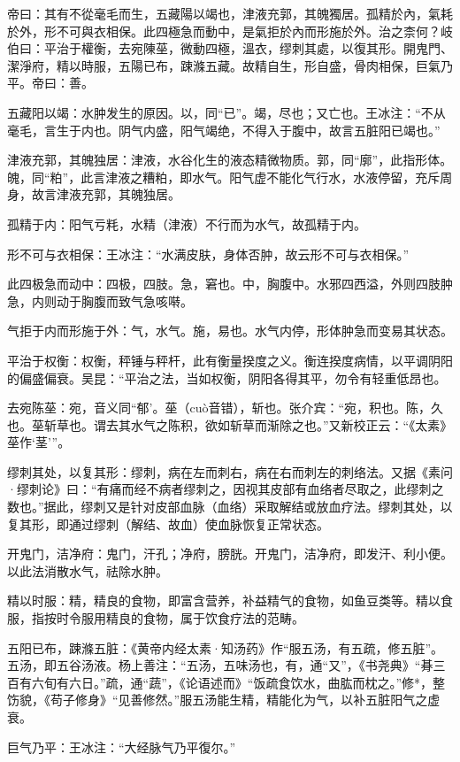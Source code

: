 \documentclass[draft,12pt]{ctexbook}
\begin{document}

\begin{yuanwen}
帝曰：其有不從毫毛而生，五藏陽以竭也，津液充郭，其魄獨居。孤精於內，氣耗於外，形不可與衣相保。此四極急而動中，是氣拒於內而形施於外。治之柰何？岐伯曰：平治于權衡，去宛陳莝，微動四極，溫衣，缪刺其處，以復其形。開鬼門、潔淨府，精以時服，五陽已布，踈滌五藏。故精自生，形自盛，骨肉相保，巨氣乃平。帝曰：善。
\end{yuanwen}


\begin{jiaozhu}
	\item 五藏阳以竭：水肿发生的原因。以，同“已”。竭，尽也；又亡也。王冰注：“不从毫毛，言生于内也。阴气内盛，阳气竭绝，不得入于腹中，故言五脏阳已竭也。”
	\item 津液充郭，其魄独居：津液，水谷化生的液态精微物质。郭，同“廓”，此指形体。魄，同“粕”，此言津液之糟粕，即水气。阳气虚不能化气行水，水液停留，充斥周身，故言津液充郭，其魄独居。
	\item 孤精于内：阳气亏粍，水精（津液）不行而为水气，故孤精于内。
	\item 形不可与衣相保：王冰注：“水满皮肤，身体否肿，故云形不可与衣相保。”
	\item 此四极急而动中：四极，四肢。急，窘也。中，胸腹中。水邪四西溢，外则四肢肿急，内则动于胸腹而致气急咳啭。
	\item 气拒于内而形施于外：气，水气。施，易也。水气内停，形体肿急而变易其状态。
	\item 平治于权衡：权衡，秤锤与秤杆，此有衡量揆度之义。衡连揆度病情，以平调阴阳的偏盛偏衰。吴昆：“平治之法，当如权衡，阴阳各得其平，勿令有轻重低昂也。
	\item 去宛陈莝：宛，音义同“郁'。莝（cuò音错），斩也。张介宾：“宛，积也。陈，久也。莝斩草也。谓去其水气之陈积，欲如斩草而渐除之也。”又新校正云：“《太素》莝作‘茎’”。
	\item 缪刺其处，以复其形：缪刺，病在左而刺右，病在右而刺左的刺络法。又据《素问·缪刺论》曰：“有痛而经不病者缪刺之，因视其皮部有血络者尽取之，此缪刺之数也。”据此，缪刺又是针对皮部血脉（血络）采取解结或放血疗法。缪刺其处，以复其形，即通过缪刺（解结、故血）使血脉恢复正常状态。
	\item 开鬼门，洁净府：鬼门，汗孔；净府，膀胱。开鬼门，洁净府，即发汗、利小便。以此法消散水气，祛除水肿。
	\item 精以时服：精，精良的食物，即富含营养，补益精气的食物，如鱼豆类等。精以食服，指按时令服用精良的食物，属于饮食疗法的范畴。
	\item 五阳已布，踈滌五脏：《黄帝内经太素·知汤药》作“服五汤，有五疏，修五脏”。五汤，即五谷汤液。杨上善注：“五汤，五味汤也，有，通“又”，《书尧典》“朞三百有六旬有六日。”疏，通“蔬”，《论语述而》“饭疏食饮水，曲肱而枕之。”修*，整饬貌，《苟子修身》“见善修然。”服五汤能生精，精能化为气，以补五脏阳气之虚衰。
	\item 巨气乃平：王冰注：“大经脉气乃平復尔。”
\end{jiaozhu}
\end{document}
